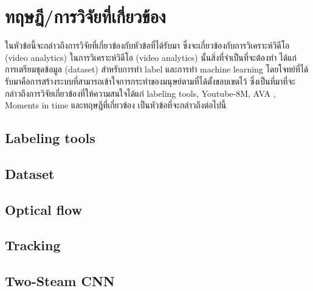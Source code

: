 \clearpage
\chapter{ทฤษฎี/การวิจัยที่เกี่ยวข้อง}
ในหัวข้อนี้จะกล่าวถึงการวิจัยที่เกี่ยวข้องกับหัวข้อที่ได้รับมา ซึ่งจะเกี่ยวข้องกับการวิเคราะห์วิดีโอ (video analytics) ในการวิเคราะห์วิดีโอ (video analytics) นั้นสิ่งที่จำเป็นที่จะต้องทำ ได้แก่ การเตรียมชุดข้อมูล (dataset) สำหรับการทำ label และการทำ machine learning โดยโจทย์ที่ได้รับมาคือการสร้างระบบที่สามารถเข้าใจการกระทำของมนุษย์ตามที่ได้ตั้งขอบเขตไว้ ซึ่งเป็นที่มาที่จะกล่าวถึงการวิจัยเกี่ยวข้องที่ให้ความสนใจได้แก่ labeling tools, Youtube-8M, AVA , Moments in time และทฤษฎีที่เกี่ยวข้อง เป็นหัวข้อที่จะกล่าวถึงต่อไปนี้


\section{Labeling tools}


\clearpage
\section{Dataset}

\clearpage

\clearpage


\section{Optical flow}


\clearpage
\section{Tracking}


\section{Two-Steam CNN}


